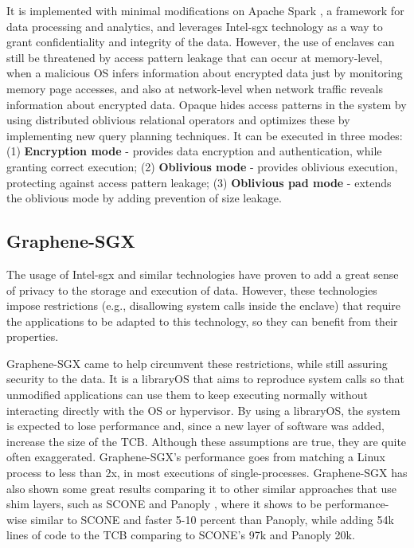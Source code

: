 It is implemented with minimal modifications on Apache Spark \cite{apacheSparkPaper}, a framework for data processing and analytics, and leverages Intel-\gls{sgx} technology as a way to grant confidentiality and integrity of the data. 
However, the use of enclaves can still be threatened by access pattern leakage that can occur at memory-level, when a malicious OS infers information about encrypted data just by monitoring memory page accesses, and also at network-level when network traffic reveals information about encrypted data.
Opaque hides access patterns in the system by using distributed oblivious relational operators and optimizes these by implementing new query planning techniques. It can be executed in three modes: 
(1) \textbf{Encryption mode} - provides data encryption and authentication, while granting correct execution;
(2) \textbf{Oblivious mode} - provides oblivious execution, protecting against access pattern leakage;
(3) \textbf{Oblivious pad mode} - extends the oblivious mode by adding prevention of size leakage.


\subsection{Graphene-SGX}
\label{ssec:grapheneSGX}

The usage of Intel-\gls{sgx} and similar technologies have proven to add a great sense of privacy to the storage and execution of data. However, these technologies impose restrictions (e.g., disallowing system calls inside the enclave) that require the applications to be  adapted to this technology, so they can benefit from their properties. 

Graphene-SGX \cite{graphenePaper} came to help circumvent these restrictions, while still assuring security to the data. It is a libraryOS that aims to reproduce system calls so that unmodified applications can use them to keep executing normally without interacting directly with the OS or hypervisor. 
By using a libraryOS, the system is expected to lose performance and, since a new layer of software was added, increase the size of the TCB. 
Although these assumptions are true, they are quite often exaggerated. Graphene-SGX's performance goes from matching a Linux process to less than 2x, in most executions of single-processes.
Graphene-SGX has also shown some great results comparing it to other similar approaches that use shim layers, such as SCONE \cite{sconePaper} and Panoply \cite{panoplyPaper}, where it shows to be performance-wise similar to SCONE and faster 5-10 percent than Panoply, while adding 54k lines of code to the TCB comparing to SCONE's 97k and Panoply 20k.

